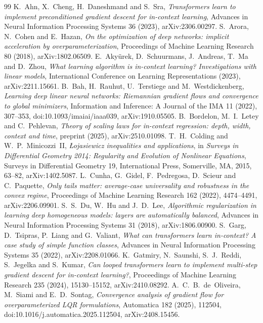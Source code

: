 \documentclass[11pt]{amsart}
\theoremstyle{remark}
\numberwithin{equation}{section}
\begin{document}
\begin{thebibliography}{99}
 K.~Ahn, X.~Cheng, H.~Daneshmand and S.~Sra, \emph{Transformers learn to implement preconditioned gradient descent for in-context learning}, Advances in Neural Information Processing Systems 36 (2023), arXiv:2306.00297.
 S.~Arora, N.~Cohen and E.~Hazan, \emph{On the optimization of deep networks: implicit acceleration by overparameterization}, Proceedings of Machine Learning Research 80 (2018), arXiv:1802.06509.
 E.~Aky\"urek, D.~Schuurmans, J.~Andreas, T.~Ma and D.~Zhou, \emph{What learning algorithm is in-context learning? Investigations with linear models}, International Conference on Learning Representations (2023), arXiv:2211.15661.
 B.~Bah, H.~Rauhut, U.~Terstiege and M.~Westdickenberg, \emph{Learning deep linear neural networks: Riemannian gradient flows and convergence to global minimizers}, Information and Inference: A Journal of the IMA 11 (2022), 307--353, doi:10.1093/imaiai/iaaa039, arXiv:1910.05505.
 B.~Bordelon, M.~I.~Letey and C.~Pehlevan, \emph{Theory of scaling laws for in-context regression: depth, width, context and time}, preprint (2025), arXiv:2510.01098.
 T.~H.~Colding and W.~P.~Minicozzi~II, \emph{\L{}ojasiewicz inequalities and applications}, in \emph{Surveys in Differential Geometry 2014: Regularity and Evolution of Nonlinear Equations}, Surveys in Differential Geometry 19, International Press, Somerville, MA, 2015, 63--82, arXiv:1402.5087.
 L.~Cunha, G.~Gidel, F.~Pedregosa, D.~Scieur and C.~Paquette, \emph{Only tails matter: average-case universality and robustness in the convex regime}, Proceedings of Machine Learning Research 162 (2022), 4474--4491, arXiv:2206.09901.
 S.~S.~Du, W.~Hu and J.~D.~Lee, \emph{Algorithmic regularization in learning deep homogeneous models: layers are automatically balanced}, Advances in Neural Information Processing Systems 31 (2018), arXiv:1806.00900.
 S.~Garg, D.~Tsipras, P.~Liang and G.~Valiant, \emph{What can transformers learn in-context? A case study of simple function classes}, Advances in Neural Information Processing Systems 35 (2022), arXiv:2208.01066.
 K.~Gatmiry, N.~Saunshi, S.~J.~Reddi, S.~Jegelka and S.~Kumar, \emph{Can looped transformers learn to implement multi-step gradient descent for in-context learning?}, Proceedings of Machine Learning Research 235 (2024), 15130--15152, arXiv:2410.08292.
 A.~C.~B.~de~Oliveira, M.~Siami and E.~D.~Sontag, \emph{Convergence analysis of gradient flow for overparameterized LQR formulations}, Automatica 182 (2025), 112504, doi:10.1016/j.automatica.2025.112504, arXiv:2408.15456.

\end{thebibliography}
\end{document}
